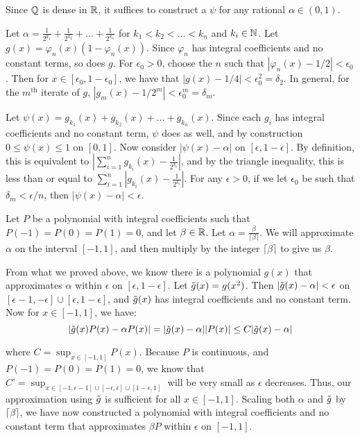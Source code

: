 \documentclass{hmwk}
\begin{document}
\begin{solution}
\pre Since $\mathbb{Q}$ is dense in $\mathbb{R}$, it suffices to construct a $\psi$ for any rational $\alpha \in (0, 1)$. 

\pre Let $\alpha = \frac{1}{2^{k_1}} + \frac{1}{2^{k_2}} + \dots + \frac{1}{2^{k_n}}$ for $k_1 < k_2 < \dots < k_n$ and $k_i \in \mathbb{N}$. Let $g(x) = \varphi_n(x)(1 - \varphi_n(x))$. Since $\varphi_n$ has integral coefficients and no constant terms, so does $g$. For $\epsilon_0 > 0$, choose the $n$ such that $|\varphi_n(x) - 1/2| < \epsilon_0$. Then for $x \in [\epsilon_0, 1 - \epsilon_0]$, we have that $|g(x) - 1/4| < \epsilon_0^2 = \delta
_2$. In general, for the $m^\text{th}$ iterate of $g$, $|g_m(x) - 1/2^m| < \epsilon_0^m = \delta_m$. 

\pre Let $\psi(x) = g_{k_1}(x) + g_{k_2}(x) + \dots + g_{k_n}(x)$. Since each $g_i$ has integral coefficients and no constant term, $\psi$ does as well, and by construction $0 \leq \psi(x) \leq 1$ on $[0, 1]$. Now consider $|\psi(x) - \alpha|$ on $[\epsilon, 1 - \epsilon]$. By definition, this is equivalent to $\left|\sum_{i=1}^n g_{k_i}(x) - \frac{1}{2^{k_i}}\right|$, and by the triangle inequality, this is less than or equal to $\sum_{i=1}^n \left|g_{k_i}(x) - \frac{1}{2^{k_i}}\right|$. For any $\epsilon > 0$, if we let $\epsilon_0$ be such that $\delta_m < \epsilon/n$, then $|\psi(x) - \alpha| < \epsilon$.

\pre Let $P$ be a polynomial with integral coefficients such that $P(-1) = P(0) = P(1) = 0$, and let $\beta \in \mathbb{R}$. Let $\alpha = \frac{\beta}{\lceil \beta \rceil}$. We will approximate $\alpha$ on the interval $[-1, 1]$, and then multiply by the integer $\lceil \beta \rceil$ to give us $\beta$. 

\pre From what we proved above, we know there is a polynomial $g(x)$ that approximates $\alpha$ within $\epsilon$ on $[\epsilon, 1 - \epsilon]$. Let $\Tilde{g}(x) = g(x^2)$. Then $|\Tilde{g}(x) - \alpha| < \epsilon$ on $[\epsilon - 1, -\epsilon] \cup [\epsilon, 1 - \epsilon]$, and $\Tilde{g}(x)$ has integral coefficients and no constant term. Now for $x \in [-1, 1]$, we have:
$$|\Tilde{g}(x)P(x) - \alpha P(x)| = |\Tilde{g}(x) - \alpha||P(x)| \leq C|\Tilde{g}(x) - \alpha|$$

\pre where $C = \sup_{x \in [-1, 1]}P(x)$. Because $P$ is continuous, and $P(-1) = P(0) = P(1) = 0$, we know that $C’ = \sup_{x \in [-1, \epsilon - 1] \cup [-\epsilon, \epsilon] \cup [1 - \epsilon, 1]}$ will be very small as $\epsilon$ decreases. Thus, our approximation using $\Tilde{g}$ is sufficient for all $x \in [-1, 1]$. Scaling both $\alpha$ and $\Tilde{g}$ by $\lceil \beta \rceil$, we have now constructed a polynomial with integral coefficients and no constant term that approximates $\beta P$ within $\epsilon$ on $[-1, 1]$. 


\end{solution}
\end{document}
